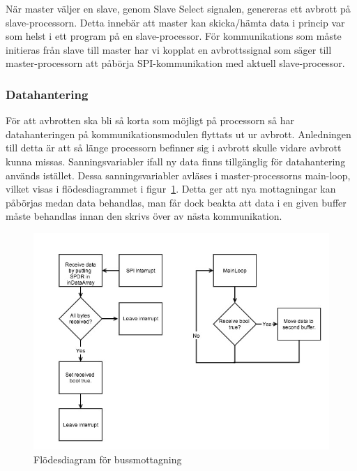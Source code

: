 \documentclass[a4paper,12pt,fleqn]{article}
\begin{document}
När master väljer en slave, genom Slave Select signalen, genereras ett avbrott på slave-processorn. Detta innebär att master kan skicka/hämta data i princip var som helst i ett program på en slave-processor. För kommunikations som måste initieras från slave till master har vi kopplat en avbrottssignal som säger till master-processorn att påbörja SPI-kommunikation med aktuell slave-processor.

\subsubsection{Datahantering}
För att avbrotten ska bli så korta som möjligt på processorn så har datahanteringen på kommunikationsmodulen flyttats ut ur avbrott. Anledningen till detta är att så länge processorn befinner sig i avbrott skulle vidare avbrott kunna missas. Sanningsvariabler ifall ny data finns tillgänglig för datahantering används istället. Dessa sanningsvariabler avläses i master-processorns main-loop, vilket visas i flödesdiagrammet i figur~\ref{fig:SPIrec}. Detta ger att nya mottagningar kan påbörjas medan data behandlas, man får dock beakta att data i en given buffer måste behandlas innan den skrivs över av nästa kommunikation.

\begin{figure}[htp] %
  \begin{center}
  \includegraphics[keepaspectratio=true,scale=0.5]{spirec.jpg}  %
  \end{center}
  \caption{Flödesdiagram för bussmottagning} %
  \label{fig:SPIrec}
\end{figure}
\end{document}
